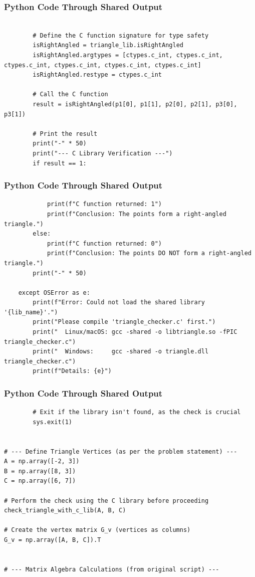 \documentclass{beamer}
\begin{document}
\begin{frame}[fragile]
\frametitle{Python Code Through Shared Output}
\begin{lstlisting}

        # Define the C function signature for type safety
        isRightAngled = triangle_lib.isRightAngled
        isRightAngled.argtypes = [ctypes.c_int, ctypes.c_int, ctypes.c_int, ctypes.c_int, ctypes.c_int, ctypes.c_int]
        isRightAngled.restype = ctypes.c_int

        # Call the C function
        result = isRightAngled(p1[0], p1[1], p2[0], p2[1], p3[0], p3[1])

        # Print the result
        print("-" * 50)
        print("--- C Library Verification ---")
        if result == 1:
        \end{lstlisting}
\end{frame}  

\begin{frame}[fragile]
\frametitle{Python Code Through Shared Output}
\begin{lstlisting}
            print(f"C function returned: 1")
            print(f"Conclusion: The points form a right-angled triangle.")
        else:
            print(f"C function returned: 0")
            print(f"Conclusion: The points DO NOT form a right-angled triangle.")
        print("-" * 50)

    except OSError as e:
        print(f"Error: Could not load the shared library '{lib_name}'.")
        print("Please compile 'triangle_checker.c' first.")
        print("  Linux/macOS: gcc -shared -o libtriangle.so -fPIC triangle_checker.c")
        print("  Windows:     gcc -shared -o triangle.dll triangle_checker.c")
        print(f"Details: {e}")
        \end{lstlisting}
\end{frame}  

\begin{frame}[fragile]
\frametitle{Python Code Through Shared Output}
\begin{lstlisting}
        # Exit if the library isn't found, as the check is crucial
        sys.exit(1)


# --- Define Triangle Vertices (as per the problem statement) ---
A = np.array([-2, 3])
B = np.array([8, 3])
C = np.array([6, 7])

# Perform the check using the C library before proceeding
check_triangle_with_c_lib(A, B, C)

# Create the vertex matrix G_v (vertices as columns)
G_v = np.array([A, B, C]).T


# --- Matrix Algebra Calculations (from original script) ---
\end{lstlisting}
\end{frame}  
\end{document}
